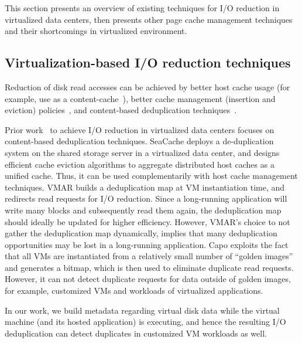 
% 





This section presents an overview
of existing techniques for I/O reduction in virtualized data centers,
then presents other page cache management techniques and their
shortcomings in virtualized environment.

\subsection{Virtualization-based I/O reduction techniques}
Reduction of disk read accesses can be achieved by 
better host cache usage (for example, use as a content-cache~\cite{iodedup}),
better cache management 
(insertion and eviction) policies~\cite{outperforming-LRU}, 
and content-based deduplication techniques~\cite{VMAR}.

Prior work~\cite{cooperative, VMAR, capo} to achieve I/O reduction in 
virtualized data centers focuses on content-based deduplication techniques.
SeaCache\cite{cooperative} deploys a de-duplication
system on the shared storage server in a virtualized data center, and
designs efficient cache eviction algorithms to aggregate distributed
host caches as a unified cache. Thus, it can be used
complementarily with host cache management techniques.
VMAR\cite{VMAR} builds a deduplication map at VM instantiation
time, and redirects read requests for I/O reduction.
Since a long-running application will write many blocks and subsequently
read them again, the deduplication map should ideally be updated for
higher efficiency. However, VMAR's choice to not gather the deduplication 
map dynamically, implies that many
deduplication opportunities may be lost in a long-running application.
Capo\cite{capo} exploits the fact that all VMs are instantiated
from a relatively small number of ``golden images'' and generates a bitmap,
which is then used to eliminate duplicate read requests. However, it
can not detect duplicate requests for data outside of golden images,
for example, customized VMs and workloads of
virtualized applications.

In our work, we build metadata regarding virtual disk data while
the virtual machine (and its hosted application) is executing, and hence
the resulting I/O deduplication can detect duplicates in customized
VM workloads as well.

